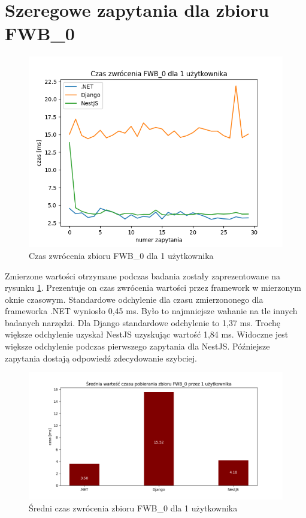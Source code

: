 \section{Szeregowe zapytania dla zbioru FWB\_0}

\begin{figure}[!hb]
	\centering \includegraphics[width=1\linewidth]{rysunki/Czas_zwrocenia_FWB_0_dla_1_uzytkownika.png}
	\caption{Czas zwrócenia zbioru FWB\_0 dla 1 użytkownika}
	\label{rys:request_duration_for_FWB_0}
\end{figure}

Zmierzone wartości otrzymane podczas badania zostały zaprezentowane na rysunku \ref{rys:request_duration_for_FWB_0}.
Prezentuje on czas zwrócenia wartości przez framework w mierzonym oknie czasowym.
Standardowe odchylenie dla czasu zmierzononego dla frameworka .NET wyniosło 0,45 ms.
Było to najmniejsze wahanie na tle innych badanych narzędzi.
Dla Django standardowe odchylenie to 1,37 ms.
Trochę większe odchylenie uzyskał NestJS uzyskując wartość 1,84 ms.
Widoczne jest większe odchylenie podczas pierwszego zapytania dla NestJS.
Późniejsze zapytania dostają odpowiedź zdecydowanie szybciej.

\begin{figure}[!hb]
	\centering \includegraphics[width=1\linewidth]{rysunki/Srednia_wartosc_czasu_pobierania_zbioru_FWB_0_przez_1_uzytkownika.png}
	\caption{Średni czas zwrócenia zbioru FWB\_0 dla 1 użytkownika}
	\label{rys:mean_duration_for_FWB_0}
\end{figure}

